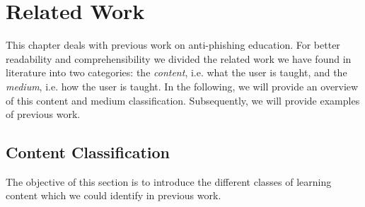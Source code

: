 
\section{Related Work}
\label{s:related_work}

This chapter deals with previous work on anti-phishing education.
 For better readability and comprehensibility we divided the related work we have found in literature into two categories: the \textit{content}, i.e.
 what the user is taught, and the 
\textit{medium}, i.e. how the user is taught.
 In the following, we will provide an overview of this content and medium classification.
 Subsequently, we will provide examples of previous work.


\subsection{Content Classification}
The objective of this section is to introduce the different classes of learning content which we could identify in previous work.


